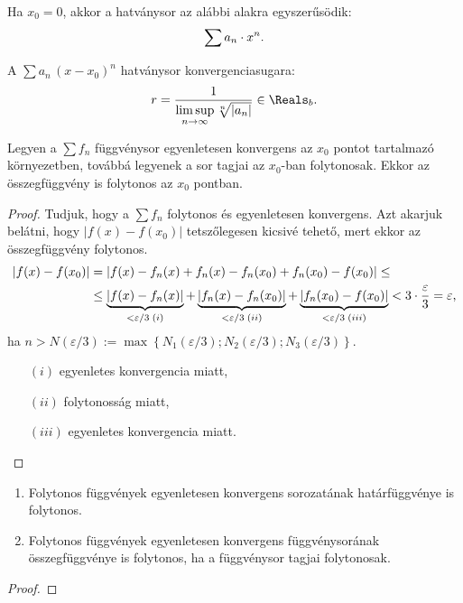 \begin{note}
  Ha $x_0 = 0$, akkor a hatványsor az alábbi alakra egyszerűsödik:
  $$
    \sum a_n \cdot x^n
    \text.
  $$
\end{note}

\begin{definition}
  A $\sum a_n \, (x - x_0)^n$ hatványsor konvergenciasugara:
  $$
    r = \frac{1}{\limsup\limits_{n \to \infty} \sqrt[n]{|a_n|}} \in \Reals_b
    \text.
  $$
\end{definition}

\begin{theorem}
  Legyen a $\sum f_n$ függvénysor egyenletesen konvergens az $x_0$ pontot
  tartalmazó környezetben, továbbá legyenek a sor tagjai az $x_0$-ban
  folytonosak. Ekkor az összegfüggvény is folytonos az $x_0$ pontban.

  \begin{proof}
    Tudjuk, hogy a $\sum f_n$ folytonos és egyenletesen konvergens. Azt akarjuk
    belátni, hogy $|f(x) - f(x_0)|$ tetszőlegesen kicsivé tehető, mert ekkor az
    összegfüggvény folytonos.
    \begin{align*}
      |f(x) - f(x_0)|
       & = |f(x) - f_n(x) + f_n(x) - f_n(x_0) + f_n(x_0) - f(x_0)| \leq
      \\
       & \leq \underbrace{|f(x) - f_n(x)|}_{< \varepsilon / 3 \; (i)}
      + \underbrace{|f_n(x) - f_n(x_0)|}_{< \varepsilon / 3 \; (ii)}
      + \underbrace{|f_n(x_0) - f(x_0)|}_{< \varepsilon / 3 \; (iii)}
      < 3 \cdot \frac{\varepsilon}{3} = \varepsilon
      \text,
    \end{align*}
    ha $n > N(\varepsilon / 3) := \max \left\{
      N_1(\varepsilon / 3); N_2(\varepsilon / 3); N_3(\varepsilon / 3)
      \right\}$.
    \begin{itemize}
      \item[$(i)$] egyenletes konvergencia miatt,
      \item[$(ii)$] folytonosság miatt,
      \item[$(iii)$] egyenletes konvergencia miatt.
    \end{itemize}
  \end{proof}
\end{theorem}

\begin{statement}
  \begin{enumerate}
    \item Folytonos függvények egyenletesen konvergens sorozatának
          határfüggvénye is \\folytonos.

    \item Folytonos függvények egyenletesen konvergens függvénysorának
          összegfüggvénye is folytonos, ha a függvénysor tagjai folytonosak.
  \end{enumerate}

  \begin{proof}
    \vspace{6em}
  \end{proof}
\end{statement}

